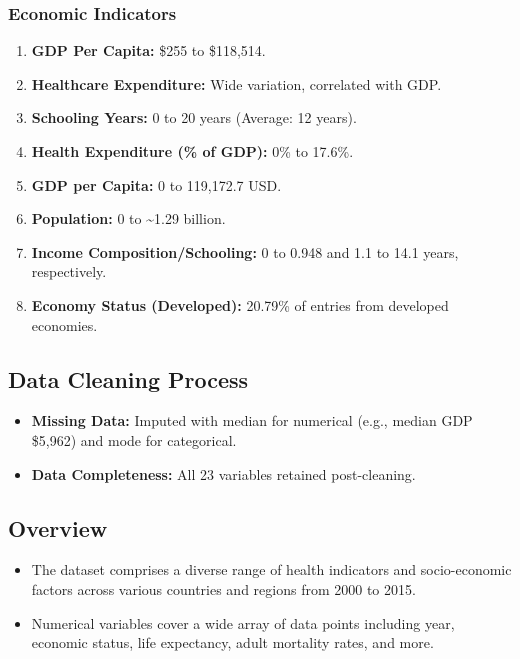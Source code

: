 \documentclass[
]{article}
\providecommand{\tightlist}{%
  \setlength{\itemsep}{0pt}\setlength{\parskip}{0pt}}
\begin{document}
\hypertarget{economic-indicators}{%
\subsubsection{Economic Indicators}\label{economic-indicators}}

\begin{enumerate}
\def\labelenumi{\arabic{enumi}.}
\tightlist
\item
  \textbf{GDP Per Capita:} \$255 to \$118,514.
\item
  \textbf{Healthcare Expenditure:} Wide variation, correlated with GDP.
\item
  \textbf{Schooling Years:} 0 to 20 years (Average: 12 years).
\item
  \textbf{Health Expenditure (\% of GDP):} 0\% to 17.6\%.
\item
  \textbf{GDP per Capita:} 0 to 119,172.7 USD.
\item
  \textbf{Population:} 0 to \textasciitilde1.29 billion.
\item
  \textbf{Income Composition/Schooling:} 0 to 0.948 and 1.1 to 14.1
  years, respectively.
\item
  \textbf{Economy Status (Developed):} 20.79\% of entries from developed
  economies.
\end{enumerate}

\hypertarget{data-cleaning-process}{%
\subsection{Data Cleaning Process}\label{data-cleaning-process}}

\begin{itemize}
\tightlist
\item
  \textbf{Missing Data:} Imputed with median for numerical (e.g., median
  GDP \$5,962) and mode for categorical.
\item
  \textbf{Data Completeness:} All 23 variables retained post-cleaning.
\end{itemize}

\hypertarget{overview}{%
\subsection{Overview}\label{overview}}

\begin{itemize}
\tightlist
\item
  The dataset comprises a diverse range of health indicators and
  socio-economic factors across various countries and regions from 2000
  to 2015.
\item
  Numerical variables cover a wide array of data points including year,
  economic status, life expectancy, adult mortality rates, and more.
\end{itemize}
\end{document}

